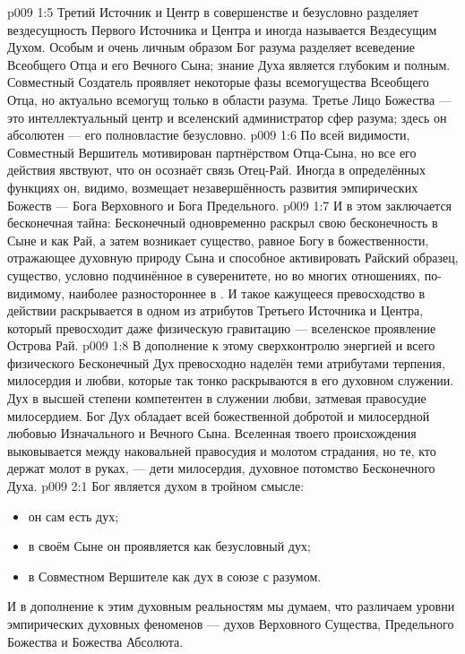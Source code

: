 \vs p009 1:5 \pc Третий Источник и Центр в совершенстве и безусловно разделяет вездесущность Первого Источника и Центра и иногда называется Вездесущим Духом. Особым и очень личным образом Бог разума разделяет всеведение Всеобщего Отца и его Вечного Сына; знание Духа является глубоким и полным. Совместный Создатель проявляет некоторые фазы всемогущества Всеобщего Отца, но актуально всемогущ только в области разума. Третье Лицо Божества --- это интеллектуальный центр и вселенский администратор сфер разума; здесь он абсолютен --- его полновластие безусловно.
\vs p009 1:6 По всей видимости, Совместный Вершитель мотивирован партнёрством Отца\hyp{}Сына, но все его действия явствуют, что он осознаёт связь Отец\hyp{}Рай. Иногда в определённых функциях он, видимо, возмещает незавершённость развития эмпирических Божеств --- Бога Верховного и Бога Предельного.
\vs p009 1:7 \pc И в этом заключается бесконечная тайна: Бесконечный одновременно раскрыл свою бесконечность в Сыне и как Рай, а затем возникает существо, равное Богу в божественности, отражающее духовную природу Сына и способное активировать Райский образец, существо, условно подчинённое в суверенитете, но во многих отношениях, по\hyp{}видимому, наиболее разностороннее в . И такое кажущееся превосходство в действии раскрывается в одном из атрибутов Третьего Источника и Центра, который превосходит даже физическую гравитацию --- вселенское проявление Острова Рай.
\vs p009 1:8 В дополнение к этому сверхконтролю энергией и всего физического Бесконечный Дух превосходно наделён теми атрибутами терпения, милосердия и любви, которые так тонко раскрываются в его духовном служении. Дух в высшей степени компетентен в служении любви, затмевая правосудие милосердием. Бог Дух обладает всей божественной добротой и милосердной любовью Изначального и Вечного Сына. Вселенная твоего происхождения выковывается между наковальней правосудия и молотом страдания, но те, кто держат молот в руках, --- дети милосердия, духовное потомство Бесконечного Духа.
\vs p009 2:1 Бог является духом в тройном смысле:\begin{itemize}\item он сам есть дух; \item в своём Сыне он проявляется как безусловный дух; \item в Совместном Вершителе как дух в союзе с разумом.\end{itemize} И в дополнение к этим духовным реальностям мы думаем, что различаем уровни эмпирических духовных феноменов --- духов Верховного Существа, Предельного Божества и Божества Абсолюта.
